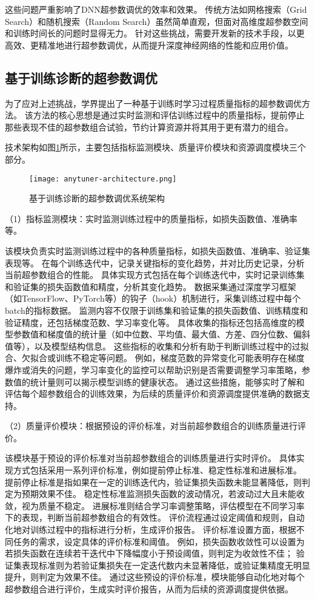 这些问题严重影响了DNN超参数调优的效率和效果。
传统方法如网格搜索（Grid Search）和随机搜索（Random Search）虽然简单直观，但面对高维度超参数空间和训练时间长的问题时显得无力。
针对这些挑战，需要开发新的技术手段，以更高效、更精准地进行超参数调优，从而提升深度神经网络的性能和应用价值。

\subsection{基于训练诊断的超参数调优}

为了应对上述挑战，学界提出了一种基于训练时学习过程质量指标的超参数调优方法\cite{Pei24}。
该方法的核心思想是通过实时监测和评估训练过程中的质量指标，提前停止那些表现不佳的超参数组合试验，节约计算资源并将其用于更有潜力的组合。

技术架构如图\ref{fig:anytunerarch}所示，主要包括指标监测模块、质量评价模块和资源调度模块三个部分。

\begin{figure}
  \centering
  \texttt{[image: anytuner-architecture.png]}
  \caption{基于训练诊断的超参数调优系统架构}
  \label{fig:anytunerarch}
\end{figure}

（1）指标监测模块：实时监测训练过程中的质量指标，如损失函数值、准确率等。

该模块负责实时监测训练过程中的各种质量指标，如损失函数值、准确率、验证集表现等。
在每个训练迭代中，记录关键指标的变化趋势，并对比历史记录，分析当前超参数组合的性能。
具体实现方式包括在每个训练迭代中，实时记录训练集和验证集的损失函数值和精度，分析其变化趋势。
数据采集通过深度学习框架（如TensorFlow、PyTorch等）的钩子（hook）机制进行，采集训练过程中每个batch的指标数据。
监测内容不仅限于训练集和验证集的损失函数值、训练精度和验证精度，还包括梯度范数、学习率变化等。
具体收集的指标还包括高维度的模型参数值和梯度值的统计量（如中位数、平均值、最大值、方差、四分位数、偏斜值等），以及模型结构信息。
这些指标的收集和分析有助于判断训练过程中的过拟合、欠拟合或训练不稳定等问题。
例如，梯度范数的异常变化可能表明存在梯度爆炸或消失的问题，学习率变化的监控可以帮助识别是否需要调整学习率策略，参数值的统计量则可以揭示模型训练的健康状态。
通过这些措施，能够实时了解和评估每个超参数组合的训练效果，为后续的质量评价和资源调度提供准确的数据支持。

（2）质量评价模块：根据预设的评价标准，对当前超参数组合的训练质量进行评价。

该模块基于预设的评价标准对当前超参数组合的训练质量进行实时评价。
具体实现方式包括采用一系列评价标准，例如提前停止标准、稳定性标准和进展标准。
提前停止标准是指如果在一定的训练迭代内，验证集损失函数未能显著降低，则判定为预期效果不佳。
稳定性标准监测损失函数的波动情况，若波动过大且未能收敛，视为质量不稳定。
进展标准则结合学习率调整策略，评估模型在不同学习率下的表现，判断当前超参数组合的有效性。
评价流程通过设定阈值和规则，自动化地对训练过程中的指标进行分析，生成评价报告。
评价标准设置方面，根据不同任务的需求，设定具体的评价标准和阈值。
例如，损失函数收敛性可以设置为若损失函数在连续若干迭代中下降幅度小于预设阈值，则判定为收敛性不佳；
验证集表现标准则为若验证集损失在一定迭代数内未显著降低，或验证集精度无明显提升，则判定为效果不佳。
通过这些预设的评价标准，模块能够自动化地对每个超参数组合进行评价，生成实时评价报告，从而为后续的资源调度提供依据。


